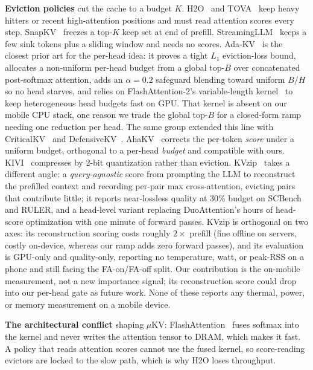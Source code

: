 \documentclass[sigconf, anonymous=false, screen=true]{acmart}
\begin{document}
\textbf{Eviction policies} cut the cache to a budget $K$. H2O~\cite{zhang2023h2o} and TOVA~\cite{oren2024tova} keep heavy hitters or recent high-attention positions and must read attention scores every step. SnapKV~\cite{li2024snapkv} freezes a top-$K$ keep set at end of prefill. StreamingLLM~\cite{xiao2024streamingllm} keeps a few sink tokens plus a sliding window and needs no scores. Ada-KV~\cite{feng2025adakv} is the closest prior art for the per-head idea: it proves a tight $L_1$ eviction-loss bound, allocates a non-uniform per-head budget from a global top-$B$ over concatenated post-softmax attention, adds an $\alpha{=}0.2$ safeguard blending toward uniform $B/H$ so no head starves, and relies on FlashAttention-2's variable-length kernel~\cite{dao2023flashattention2} to keep heterogeneous head budgets fast on GPU. That kernel is absent on our mobile CPU stack, one reason we trade the global top-$B$ for a closed-form ramp needing one reduction per head. The same group extended this line with CriticalKV~\cite{feng2025criticalkv} and DefensiveKV~\cite{feng2025defensivekv}. AhaKV~\cite{gu2025ahakv} corrects the per-token \emph{score} under a uniform budget, orthogonal to a per-head \emph{budget} and compatible with ours. KIVI~\cite{liu2024kivi} compresses by 2-bit quantization rather than eviction. KVzip~\cite{kim2025kvzip} takes a different angle: a \emph{query-agnostic} score from prompting the LLM to reconstruct the prefilled context and recording per-pair max cross-attention, evicting pairs that contribute little; it reports near-lossless quality at 30\% budget on SCBench and RULER, and a head-level variant replacing DuoAttention's hours of head-score optimization with one minute of forward passes. KVzip is orthogonal on two axes: its reconstruction scoring costs roughly $2\times$ prefill (fine offline on servers, costly on-device, whereas our ramp adds zero forward passes), and its evaluation is GPU-only and quality-only, reporting no temperature, watt, or peak-RSS on a phone and still facing the FA-on/FA-off split. Our contribution is the on-mobile measurement, not a new importance signal; its reconstruction score could drop into our per-head gate as future work. None of these reports any thermal, power, or memory measurement on a mobile device.

\textbf{The architectural conflict} shaping $\mu$KV: FlashAttention~\cite{dao2022flashattention, dao2023flashattention2} fuses softmax into the kernel and never writes the attention tensor to DRAM, which makes it fast. A policy that reads attention scores cannot use the fused kernel, so score-reading evictors are locked to the slow path, which is why H2O loses throughput.
\end{document}
